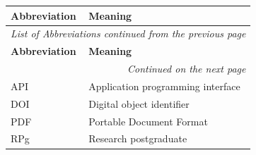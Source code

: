 \begin{longtable}{@{}p{}p{}@{}}
  \toprule
  \textbf{Abbreviation} & \textbf{Meaning} \\
  \midrule
  \endfirsthead

  \multicolumn{2}{l}{\small\itshape List of Abbreviations continued from the previous page}\\
  \toprule
  \textbf{Abbreviation} & \textbf{Meaning} \\
  \midrule
  \endhead

  \midrule
  \multicolumn{2}{r}{\small\itshape Continued on the next page}\\
  \endfoot

  \bottomrule
  \endlastfoot

  API  & Application programming interface \\
  DOI  & Digital object identifier \\
  PDF  & Portable Document Format \\
  RPg  & Research postgraduate \\
\end{longtable}
